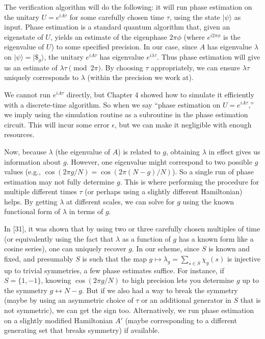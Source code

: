 \documentclass[11pt]{article}
\theoremstyle{definition}
\begin{document}
    The verification algorithm will do the following: it will run phase estimation on the unitary $U = e^{iA\tau}$ for some carefully chosen time $\tau$, using the state $|\psi\rangle$ as input. Phase estimation is a standard quantum algorithm that, given an eigenstate of $U$, yields an estimate of the eigenphase $2\pi \phi$ (where $e^{i 2\pi \phi}$ is the eigenvalue of $U$) to some specified precision. In our case, since $A$ has eigenvalue $\lambda$ on $|\psi\rangle = |\$_g\rangle$, the unitary $e^{iA\tau}$ has eigenvalue $e^{i \lambda \tau}$. Thus phase estimation will give us an estimate of $\lambda \tau \pmod{2\pi}$. By choosing $\tau$ appropriately, we can ensure $\lambda \tau$ uniquely corresponds to $\lambda$ (within the precision we work at).

    We cannot run $e^{iA\tau}$ directly, but Chapter 4 showed how to simulate it efficiently with a discrete-time algorithm. So when we say “phase estimation on $U = e^{iA\tau}$,” we imply using the simulation routine as a subroutine in the phase estimation circuit. This will incur some error $\epsilon$, but we can make it negligible with enough resources.

    Now, because $\lambda$ (the eigenvalue of $A$) is related to $g$, obtaining $\lambda$ in effect gives us information about $g$. However, one eigenvalue might correspond to two possible $g$ values (e.g., $\cos(2\pi g/N) = \cos(2\pi (N-g)/N)$). So a single run of phase estimation may not fully determine $g$. This is where performing the procedure for multiple different times $\tau$ (or perhaps using a slightly different Hamiltonian) helps. By getting $\lambda$ at different scales, we can solve for $g$ using the known functional form of $\lambda$ in terms of $g$. 

    In [31], it was shown that by using two or three carefully chosen multiples of time (or equivalently using the fact that $\lambda$ as a function of $g$ has a known form like a cosine series), one can uniquely recover $g$. In our scheme, since $S$ is known and fixed, and presumably $S$ is such that the map $g \mapsto \lambda_g = \sum_{s\in S} \chi_g(s)$ is injective up to trivial symmetries, a few phase estimates suffice. For instance, if $S=\{1,-1\}$, knowing $\cos(2\pi g/N)$ to high precision lets you determine $g$ up to the symmetry $g \leftrightarrow N-g$. But if we also had a way to break the symmetry (maybe by using an asymmetric choice of $\tau$ or an additional generator in $S$ that is not symmetric), we can get the sign too. Alternatively, we run phase estimation on a slightly modified Hamiltonian $A'$ (maybe corresponding to a different generating set that breaks symmetry) if available.
\end{document}
